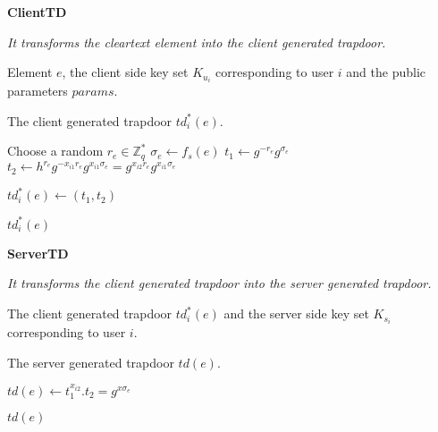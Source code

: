 \documentclass[epsfig,a4paper,11pt,titlepage]{book}
\numberwithin{algorithm}{chapter}
\newcommand{\algofontsize}{\fontsize{11}{12}\selectfont}
\begin{document}
\begin{algorithm} [htp]
{\algofontsize
\caption{\textbf{ClientTD}}

\label{algo:erbac-client-td}

\begin{algorithmic}[1]

\INPUT \emph{It transforms the cleartext element into the client generated trapdoor.}

\Require Element $e$, the client side key set $K_{u_i}$ corresponding to user $i$ and the public parameters $params$.

\Ensure The client generated trapdoor $td^*_i (e)$.

\medskip

\State Choose a random $r_{e} \in \mathbb{Z}^*_q$ \label{line:erbac-c-td-choose}
\State ${\sigma}_{e} \leftarrow f_s (e)$ \label{line:erbac-c-td-sigma}
\State $t_1 \leftarrow g^{-r_{e}} g^{{\sigma}_{e}}$ \label{line:erbac-c-td-t1}
\State $t_2 \leftarrow h^{r_{e}} g^{-x_{i1}r_{e}} g^{x_{i1}{\sigma}_{e}} = g^{x_{i2}r_{e}} g^{x_{i1}{\sigma}_{e}}$ \label{line:erbac-c-td-t2}

\State $td^*_i (e) \leftarrow (t_1, t_2)$ \label{line:erbac-c-td-td}

\Return $td^*_i (e)$

\end{algorithmic}
}
\end{algorithm}





\begin{algorithm} [htp]
{\algofontsize
\caption{\textbf{ServerTD}}

\label{algo:erbac-server-td}

\begin{algorithmic}[1]

\INPUT \emph{It transforms the client generated trapdoor into the server generated trapdoor.}

\Require The client generated trapdoor $td^*_i (e)$ and the server side key set $K_{s_i}$ corresponding to user $i$.

\Ensure The server generated trapdoor $td(e)$.

\medskip

\State $td(e) \leftarrow t_1^{x_{i2}} . t_2 = g^{x{\sigma}_{e}}$ \label{line:erbac-s-td-calculate}

\Return $td(e)$

\end{algorithmic}
}
\end{algorithm}
\end{document}
